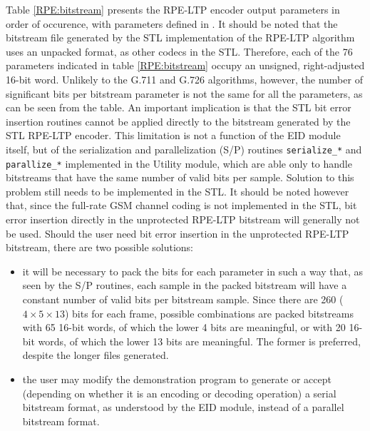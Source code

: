 Table \ref{RPE:bitstream} presents the RPE-LTP encoder output
parameters in order of occurence, with parameters defined in
\cite{GSM-06.10}. It should be noted that the bitstream file generated
by the STL implementation of the RPE-LTP algorithm uses an unpacked
format, as other codecs in the STL. Therefore, each of the 76
parameters indicated in table \ref{RPE:bitstream} occupy an unsigned,
right-adjusted 16-bit word. Unlikely to the G.711 and G.726
algorithms, however, the number of significant bits per bitstream
parameter is not the same for all the parameters, as can be seen from
the table. An important implication is that the STL bit error
insertion routines cannot be applied directly to the bitstream
generated by the STL RPE-LTP encoder. This limitation is not a
function of the EID module itself, but of the serialization and
parallelization (S/P) routines {\tt serialize\_*} and {\tt
parallize\_*} implemented in the Utility module, which are able only to
handle bitstreams that have the same number of valid bits per
sample. Solution to this problem still needs to be implemented in the
STL. It should be noted however that, since the full-rate GSM channel
coding is not implemented in the STL, bit error insertion directly in
the unprotected RPE-LTP bitstream will generally not be used. Should
the user need bit error insertion in the unprotected RPE-LTP
bitstream, there are two possible solutions:
\begin{itemize}
  \item it will be necessary to pack the bits for each parameter in
    such a way that, as seen by the S/P routines, each sample in the
    packed bitstream will have a constant number of valid bits per
    bitstream sample. Since there are 260 ($4 \times 5 \times 13$)
    bits for each frame, possible combinations are packed
    bitstreams with 65 16-bit words, of which the lower 4 bits are
    meaningful, or with 20 16-bit words, of which the lower 13 bits are
    meaningful. The former is preferred, despite the longer files
    generated.
  \item the user may modify the demonstration program to generate or accept
    (depending on whether it is an encoding or decoding operation) a
    serial bitstream format, as understood by the EID module, instead
    of a parallel bitstream format.
\end{itemize}

